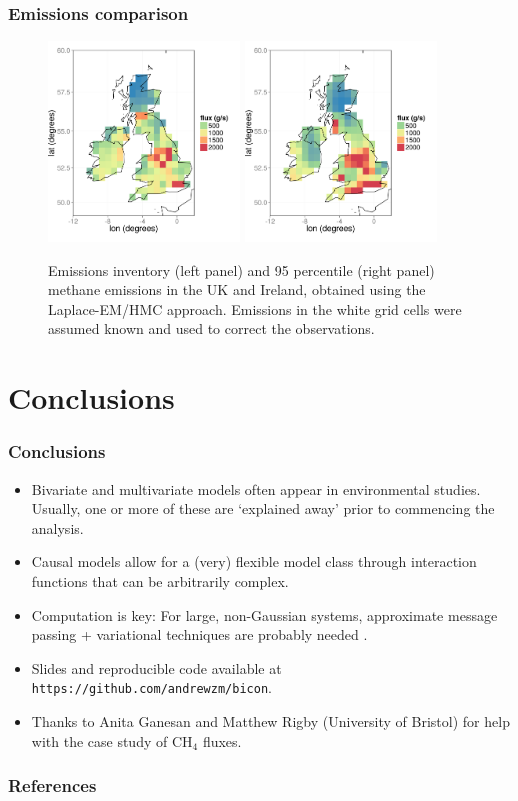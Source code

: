 \documentclass{beamer}
\begin{document}
\begin{frame}
\frametitle{Emissions comparison}

\begin{figure}
\includegraphics[width=2.0in]{NAEI_land_only.png}
\includegraphics[width=2.0in]{Em95.png}
	\caption{Emissions inventory (left panel) and 95 percentile (right panel) methane emissions in the UK and Ireland, obtained using the Laplace-EM/HMC approach. Emissions in the white grid cells were assumed known and used to correct the observations.}
\end{figure}
\end{frame}



\section{Conclusions}

\begin{frame}
\sectionpage
\end{frame}


\begin{frame}
\frametitle{Conclusions}

\begin{itemize}
\item Bivariate and multivariate models often appear in environmental studies. Usually, one or more of these are `explained away' prior to commencing the analysis.
\item Causal models allow for a (very) flexible model class through interaction functions that can be arbitrarily complex.
\item Computation is key: For large, non-Gaussian systems, approximate message passing + variational techniques are probably needed \citep{Cseke_2014}.
\item Slides and reproducible code available at \texttt{https://github.com/andrewzm/bicon}.
\item Thanks to Anita Ganesan and Matthew Rigby (University of Bristol) for help with the case study of CH$_4$ fluxes.
\end{itemize}
\end{frame}

\small

\begin{frame}[allowframebreaks]
\frametitle{References}




\end{frame}
\end{document}

